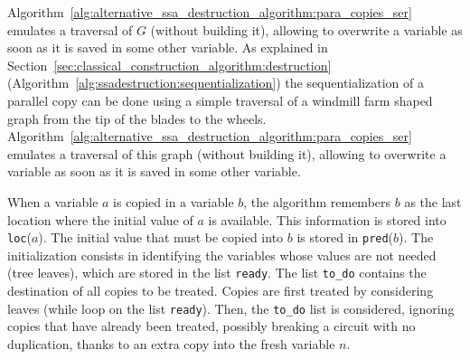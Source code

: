 Algorithm~\ref{alg:alternative_ssa_destruction_algorithm:para_copies_ser} emulates a traversal of $G$ (without
building it), allowing to overwrite a variable as soon as it is saved in some
other variable.  
\else
As explained in Section~\ref{sec:classical_construction_algorithm:destruction} (Algorithm~\ref{alg:ssadestruction:sequentialization}) the sequentialization of a parallel copy can be done using a simple traversal of a windmill farm shaped graph from the tip of the blades to the wheels. Algorithm~\ref{alg:alternative_ssa_destruction_algorithm:para_copies_ser} emulates a traversal of this graph (without building it), allowing to overwrite a variable as soon as it is saved in some
other variable.  
\fi

When a variable $a$ is copied in a variable $b$, the algorithm
remembers $b$ as the last location where the initial value of $a$ is available.
This information is stored into \texttt{loc}($a$). The initial value that
must be copied into $b$ is stored in \texttt{pred}($b$). The initialization
consists in identifying the variables whose values are not needed (tree
leaves), which are stored in the list \texttt{ready}.  The list
\texttt{to\_do} contains the destination of all copies to be treated.  Copies
are first treated by considering leaves (while loop on the list
\texttt{ready}). Then, the \texttt{to\_do} list is considered, ignoring
copies that have already been treated, possibly breaking a circuit with no
duplication, thanks to an extra copy into the fresh variable $n$.

